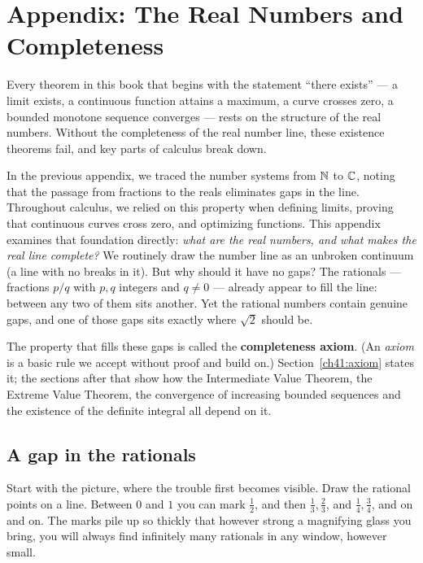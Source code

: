 \chapter{Appendix: The Real Numbers and Completeness}
\label{ch41:real-numbers-completeness}

Every theorem in this book that begins with the statement ``there exists'' --- a
limit exists, a continuous function attains a maximum, a curve crosses zero,
a bounded monotone sequence converges --- rests on the structure of the
real numbers. Without the completeness of the real number line, these existence
theorems fail, and key parts of calculus break down.

In the previous appendix, we traced the number systems from $\mathbb{N}$ to
$\mathbb{C}$, noting that the passage from fractions to the reals eliminates gaps in the
line. Throughout calculus, we relied on this property when defining
limits, proving that continuous curves cross zero, and optimizing
functions. This appendix examines that foundation directly: \emph{what are the real numbers,
and what makes the real line complete?} We routinely draw the number line
as an unbroken continuum (a line with no breaks in it). But why should it have no gaps? The rationals
--- fractions $p/q$ with $p,q$ integers and $q\ne0$ --- already appear to fill the line: between any two of them
sits another. Yet the rational numbers contain genuine gaps,
and one of those gaps sits exactly where $\sqrt{2}$ should be.

The property that fills these gaps is called the \textbf{completeness axiom}. (An
\emph{axiom} is a basic rule we accept without proof and build on.) Section~\ref{ch41:axiom}
states it; the sections after that show how the Intermediate Value Theorem, the Extreme
Value Theorem, the convergence of increasing bounded sequences and the existence of the
definite integral all depend on it.

\chapterline

\section{A gap in the rationals}
\label{ch41:gap}

Start with the picture, where the trouble first becomes visible. Draw the rational points
on a line. Between $0$ and $1$ you can mark
$\tfrac12$, and then $\tfrac13, \tfrac23$, and $\tfrac14,\tfrac34$, and on and on. The
marks pile up so thickly that however strong a magnifying glass you bring, you
will always find infinitely many rationals in any window, however small.

